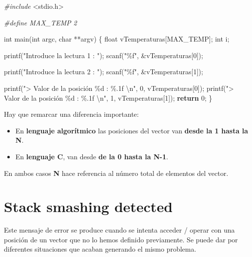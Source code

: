 \documentclass[
]{book}
\newenvironment{Shaded}{\begin{snugshade}}{\end{snugshade}}
\newcommand{\ControlFlowTok}[1]{\textcolor[rgb]{0.13,0.29,0.53}{\textbf{#1}}}
\newcommand{\DataTypeTok}[1]{\textcolor[rgb]{0.13,0.29,0.53}{#1}}
\newcommand{\DecValTok}[1]{\textcolor[rgb]{0.00,0.00,0.81}{#1}}
\newcommand{\ImportTok}[1]{#1}
\newcommand{\NormalTok}[1]{#1}
\newcommand{\PreprocessorTok}[1]{\textcolor[rgb]{0.56,0.35,0.01}{\textit{#1}}}
\newcommand{\SpecialCharTok}[1]{\textcolor[rgb]{0.00,0.00,0.00}{#1}}
\newcommand{\StringTok}[1]{\textcolor[rgb]{0.31,0.60,0.02}{#1}}
\providecommand{\tightlist}{%
  \setlength{\itemsep}{0pt}\setlength{\parskip}{0pt}}
\begin{document}
\begin{Shaded}
\begin{Highlighting}[]
\PreprocessorTok{\#include }\ImportTok{\textless{}stdio.h\textgreater{}}

\PreprocessorTok{\#define MAX\_TEMP 2}

\DataTypeTok{int}\NormalTok{ main(}\DataTypeTok{int}\NormalTok{ argc, }\DataTypeTok{char}\NormalTok{ **argv) \{}
    \DataTypeTok{float}\NormalTok{ vTemperaturas[MAX\_TEMP];}
    \DataTypeTok{int}\NormalTok{ i;}

\NormalTok{    printf(}\StringTok{"Introduce la lectura 1 : "}\NormalTok{);}
\NormalTok{    scanf(}\StringTok{"\%f"}\NormalTok{, \&vTemperaturas[}\DecValTok{0}\NormalTok{]);}

\NormalTok{    printf(}\StringTok{"Introduce la lectura 2 : "}\NormalTok{);}
\NormalTok{    scanf(}\StringTok{"\%f"}\NormalTok{, \&vTemperaturas[}\DecValTok{1}\NormalTok{]);}
    
\NormalTok{    printf(}\StringTok{"\textgreater{} Valor de la posición \%d : \%.1f }\SpecialCharTok{\textbackslash{}n}\StringTok{"}\NormalTok{, }\DecValTok{0}\NormalTok{, vTemperaturas[}\DecValTok{0}\NormalTok{]);}
\NormalTok{    printf(}\StringTok{"\textgreater{} Valor de la posición \%d : \%.1f }\SpecialCharTok{\textbackslash{}n}\StringTok{"}\NormalTok{, }\DecValTok{1}\NormalTok{, vTemperaturas[}\DecValTok{1}\NormalTok{]);}
    \ControlFlowTok{return} \DecValTok{0}\NormalTok{;}
\NormalTok{\}}
\end{Highlighting}
\end{Shaded}

Hay que remarcar una diferencia importante:

\begin{itemize}
\tightlist
\item
  En \textbf{lenguaje algorítmico} las posiciones del vector van \textbf{desde la 1 hasta la N}.
\item
  En \textbf{lenguaje C}, van desde \textbf{de la 0 hasta la N-1}.
\end{itemize}

En ambos casos \textbf{N} hace referencia al número total de elementos del vector.

\hypertarget{stack-smashing-detected}{%
\section{Stack smashing detected}\label{stack-smashing-detected}}

Este mensaje de error se produce cuando se intenta acceder / operar con una posición de un vector que no lo hemos definido previamente. Se puede dar por diferentes situaciones que acaban generando el mismo problema.
\end{document}
